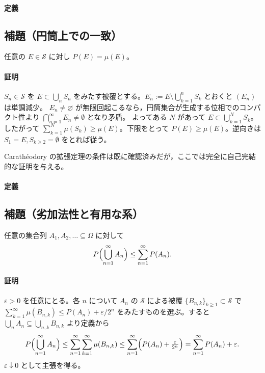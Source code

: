 \documentclass[uplatex,dvipdfmx,11pt,a4paper,openany]{bxjsbook}
\begin{document}
\paragraph{定義}
\subsection{補題（円筒上での一致）}
任意の \(E\in\mathcal{S}\) に対し \(P(E)=\mu(E)\)。

\paragraph{証明}
\(S_n\in\mathcal{S}\) を \(E\subset \bigcup_n S_n\) をみたす被覆とする。\(E_n:=E\setminus \bigcup_{k=1}^n S_k\) とおくと \((E_n)\) は単調減少。
                        \(E_n\neq\varnothing\) が無限回起こるなら，円筒集合が生成する位相でのコンパクト性より \(\bigcap_{n=1}^{\infty}E_n\neq\emptyset\) となり矛盾。
                        よってある \(N\) があって \(E\subset \bigcup_{k=1}^N S_k\)。したがって \(\sum_{k=1}^N\mu(S_k)\ge \mu(E)\)。下限をとって \(P(E)\ge \mu(E)\)。逆向きは \(S_1=E, S_{k\ge2}=\emptyset\) をとれば従う。



Carathéodory の拡張定理の条件は既に確認済みだが，ここでは完全に自己完結的な証明を与える。

\paragraph{定義}
\subsection{補題（劣加法性と有用な系）}
任意の集合列 \(A_1,A_2,\dots\subseteq\Omega\) に対して
                    \[P\Bigl(\bigcup_{n=1}^{\infty} A_n\Bigr)\le \sum_{n=1}^{\infty} P(A_n).\]

\paragraph{証明}
\(\varepsilon>0\) を任意にとる。各 \(n\) について \(A_n\) の \(\mathcal{S}\) による被覆 \(\{B_{n,k}\}_{k\ge1}\subset\mathcal{S}\) で
                        \(\sum_{k=1}^{\infty}\mu(B_{n,k})\le P(A_n)+\varepsilon/2^n\) をみたすものを選ぶ。すると
                        \(\bigcup_n A_n\subseteq \bigcup_{n,k} B_{n,k}\) より定義から
                        \[P\Bigl(\bigcup_{n=1}^{\infty} A_n\Bigr)\le \sum_{n=1}^{\infty}\sum_{k=1}^{\infty}\mu(B_{n,k})\le \sum_{n=1}^{\infty}\Bigl(P(A_n)+\tfrac{\varepsilon}{2^n}\Bigr)=\sum_{n=1}^{\infty}P(A_n)+\varepsilon.\]
                        \(\varepsilon\downarrow0\) として主張を得る。
\end{document}
